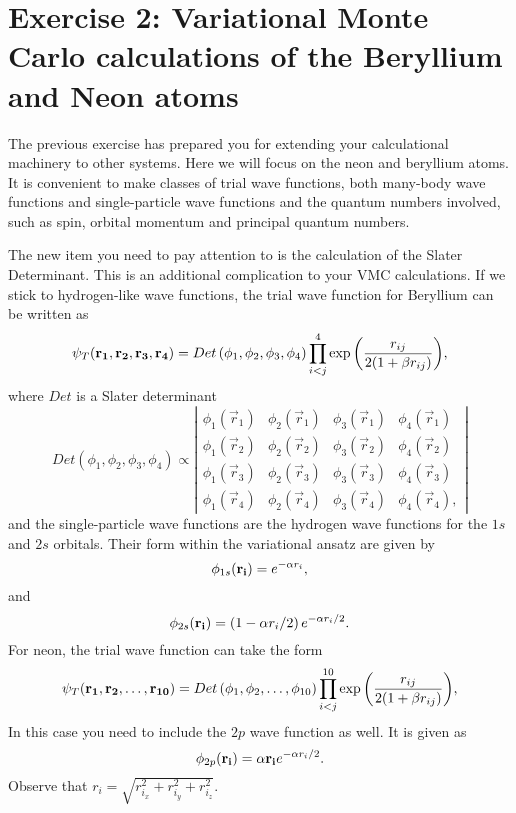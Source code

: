 
\section*{Exercise 2: Variational Monte Carlo calculations of the Beryllium and  Neon atoms}
The previous exercise has prepared you for extending your calculational machinery to other systems. Here we will focus on the neon and beryllium atoms. It is convenient to make classes of trial wave functions, both many-body wave functions and single-particle wave functions and the quantum numbers involved, such as spin, orbital momentum and principal quantum numbers.

The new item you need to pay attention to is the calculation of the Slater Determinant. This is an additional complication to your VMC calculations. If we stick to hydrogen-like wave functions, the trial wave function for Beryllium can be written as 
\begin{equation}
   \psi_{T}({\bf r_1},{\bf r_2}, {\bf r_3}, {\bf r_4}) = 
   Det\left(
   \phi_{1}, \phi_{2},
   \phi_{3}, \phi_{4}
   \right)
   \prod_{i<j}^{4}\exp{\left(\frac{r_{ij}}{2(1+\beta r_{ij})}\right)}, 
\end{equation}
where $Det$ is a Slater determinant
\begin{equation}
   Det\left(
   \phi_{1}, \phi_{2},
   \phi_{3}, \phi_{4}
   \right)
    \propto 
    \left| \begin{matrix} 
      \phi_1(\vec{r}_1) & \phi_2(\vec{r}_1) & \phi_3(\vec{r}_1) & \phi_4(\vec{r}_1) \\ 
      \phi_1(\vec{r}_2) & \phi_2(\vec{r}_2) & \phi_3(\vec{r}_2) & \phi_4(\vec{r}_2) \\ 
      \phi_1(\vec{r}_3) & \phi_2(\vec{r}_3) & \phi_3(\vec{r}_3) & \phi_4(\vec{r}_3) \\ 
      \phi_1(\vec{r}_4) & \phi_2(\vec{r}_4) & \phi_3(\vec{r}_4) & \phi_4(\vec{r}_4),
    \end{matrix} \right|
\end{equation}
and the single-particle wave functions are the hydrogen wave functions for the $1s$ and $2s$ orbitals. Their form within the variational ansatz are given by
\begin{equation}
\phi_{1s}({\bf r_i}) = e^{-\alpha r_i},
\end{equation}
and 
\begin{equation}
\phi_{2s}({\bf r_i}) = \left(1-\alpha r_i/2\right)e^{-\alpha r_i/2}.
\end{equation}
For neon, the trial wave function can take the form
\begin{equation}
   \psi_{T}({\bf r_1},{\bf r_2}, \dots,{\bf r_{10}}) = 
   Det\left(\phi_{1},\phi_{2},
   \dots,\phi_{10}\right)
   \prod_{i<j}^{10}\exp{\left(\frac{r_{ij}}{2(1+\beta r_{ij})}\right)}, 
\end{equation}
In this case you need to include the $2p$ wave function as well.
It is given as
\begin{equation} 
\phi_{2p}({\bf r_i}) = \alpha {\bf r_i}e^{-\alpha r_i/2}.
\end{equation}
Observe that $r_i = \sqrt{r_{i_x}^2+r_{i_y}^2+r_{i_z}^2}$.

